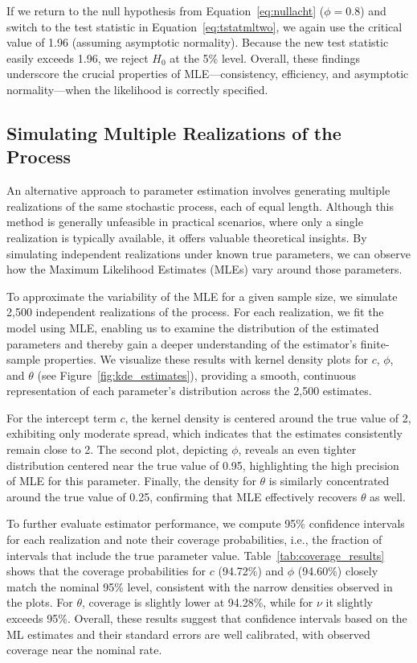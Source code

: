 \documentclass[a4paper,12pt]{article}
\begin{document}
If we return to the null hypothesis from Equation~\ref{eq:nullacht} (\(\phi=0.8\)) and switch to the test statistic in Equation~\ref{eq:tstatmltwo}, we again use the critical value of 1.96 (assuming asymptotic normality). Because the new test statistic easily exceeds 1.96, we reject \(H_0\) at the 5\% level. Overall, these findings underscore the crucial properties of MLE—consistency, efficiency, and asymptotic normality—when the likelihood is correctly specified.

\subsection{Simulating Multiple Realizations of the Process}
\label{sec:simulate_process}
An alternative approach to parameter estimation involves generating multiple realizations of the same stochastic process, each of equal length. Although this method is generally unfeasible in practical scenarios, where only a single realization is typically available, it offers valuable theoretical insights. By simulating independent realizations under known true parameters, we can observe how the Maximum Likelihood Estimates (MLEs) vary around those parameters.

To approximate the variability of the MLE for a given sample size, we simulate 2{,}500 independent realizations of the process. For each realization, we fit the model using MLE, enabling us to examine the distribution of the estimated parameters and thereby gain a deeper understanding of the estimator’s finite-sample properties. We visualize these results with kernel density plots for \(c\), \(\phi\), and \(\theta\) (see Figure~\ref{fig:kde_estimates}), providing a smooth, continuous representation of each parameter’s distribution across the 2{,}500 estimates.

For the intercept term \(c\), the kernel density is centered around the true value of 2, exhibiting only moderate spread, which indicates that the estimates consistently remain close to 2. The second plot, depicting \(\phi\), reveals an even tighter distribution centered near the true value of 0.95, highlighting the high precision of MLE for this parameter. Finally, the density for \(\theta\) is similarly concentrated around the true value of 0.25, confirming that MLE effectively recovers \(\theta\) as well.

To further evaluate estimator performance, we compute 95\% confidence intervals for each realization and note their coverage probabilities, i.e., the fraction of intervals that include the true parameter value. Table~\ref{tab:coverage_results} shows that the coverage probabilities for \(c\) (94.72\%) and \(\phi\) (94.60\%) closely match the nominal 95\% level, consistent with the narrow densities observed in the plots. For \(\theta\), coverage is slightly lower at 94.28\%, while for \(\nu\) it slightly exceeds 95\%. Overall, these results suggest that confidence intervals based on the ML estimates and their standard errors are well calibrated, with observed coverage near the nominal rate.
\end{document}
